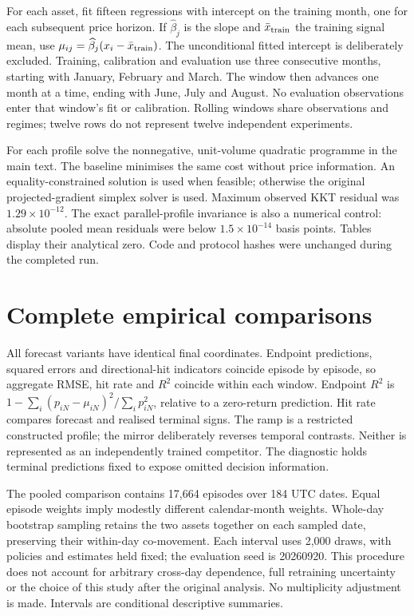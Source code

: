\documentclass[11pt]{article}
\begin{document}
For each asset, fit fifteen regressions with intercept on the training month, one for each subsequent price horizon. If $\widehat\beta_j$ is the slope and $\bar x_{\rm train}$ the training signal mean, use $\mu_{ij}=\widehat\beta_j(x_i-\bar x_{\rm train})$. The unconditional fitted intercept is deliberately excluded. Training, calibration and evaluation use three consecutive months, starting with January, February and March. The window then advances one month at a time, ending with June, July and August. No evaluation observations enter that window's fit or calibration. Rolling windows share observations and regimes; twelve rows do not represent twelve independent experiments.

For each profile solve the nonnegative, unit-volume quadratic programme in the main text. The baseline minimises the same cost without price information. An equality-constrained solution is used when feasible; otherwise the original projected-gradient simplex solver is used. Maximum observed KKT residual was $1.29\times10^{-12}$. The exact parallel-profile invariance is also a numerical control: absolute pooled mean residuals were below $1.5\times10^{-14}$ basis points. Tables display their analytical zero. Code and protocol hashes were unchanged during the completed run.

\section{Complete empirical comparisons}
All forecast variants have identical final coordinates. Endpoint predictions, squared errors and directional-hit indicators coincide episode by episode, so aggregate RMSE, hit rate and $R^2$ coincide within each window. Endpoint $R^2$ is $1-\sum_i(p_{iN}-\mu_{iN})^2/\sum_i p_{iN}^2$, relative to a zero-return prediction. Hit rate compares forecast and realised terminal signs. The ramp is a restricted constructed profile; the mirror deliberately reverses temporal contrasts. Neither is represented as an independently trained competitor. The diagnostic holds terminal predictions fixed to expose omitted decision information.

\begin{table}[htbp]\centering\small
\caption{All primary evaluation windows ($\eta=2,r=1$). Gains are objective basis points; weights are fitted on the previous month. Months are in 2026.}\resizebox{\linewidth}{!}{}
\end{table}

The pooled comparison contains 17,664 episodes over 184 UTC dates. Equal episode weights imply modestly different calendar-month weights. Whole-day bootstrap sampling retains the two assets together on each sampled date, preserving their within-day co-movement. Each interval uses 2,000 draws, with policies and estimates held fixed; the evaluation seed is 20260920. This procedure does not account for arbitrary cross-day dependence, full retraining uncertainty or the choice of this study after the original analysis. No multiplicity adjustment is made. Intervals are conditional descriptive summaries.
\end{document}
